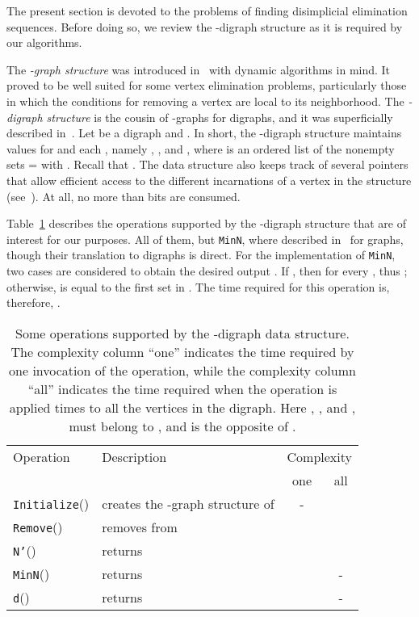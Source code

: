 \documentclass[a4paper,11pt]{article}
\begin{document}
The present section is devoted to the problems of finding disimplicial elimination sequences.  Before doing so, we review the -digraph structure as it is required by our algorithms.

The \emph{-graph structure} was introduced in~\cite{LinSoulignacSzwarcfiterTCS2012} with dynamic algorithms in mind.  It proved to be well suited for some vertex elimination problems, particularly those in which the conditions for removing a vertex are local to its neighborhood.  The \emph{-digraph structure} is the cousin of -graphs for digraphs, and it was superficially described in~\cite{LinSoulignacSzwarcfiterTCS2012}.  Let  be a digraph and .  In short, the -digraph structure maintains  values for  and each , namely , , and , where  is an ordered list of the nonempty sets  =  with .  Recall that .    The data structure also keeps track of several pointers that allow efficient access to the different incarnations of a vertex in the structure (see~\cite{LinSoulignacSzwarcfiterTCS2012}).  At all, no more than  bits are consumed.

Table~\ref{tab:h-operations} describes the operations supported by the -digraph structure that are of interest for our purposes.  All of them, but {\tt MinN}, where described in~\cite{LinSoulignacSzwarcfiterTCS2012} for graphs, though their translation to digraphs is direct.  For the implementation of {\tt MinN}, two cases are considered to obtain the desired output .  If , then  for every , thus ; otherwise,  is equal to the first set in .  The time required for this operation is, therefore, .  

\begin{table}
  \centering
  \begin{tabular}{llcc}
    \hline
    Operation & Description & \multicolumn{2}{c}{Complexity}\\
              &             & one & all \\\hline
    {\tt Initialize}() & creates the -graph structure of  & - & \\
    {\tt Remove}() & removes  from   &  &  \\
    {\tt N'}() & returns   &  &  \\
    {\tt MinN}() & returns  &  & -\\
    {\tt d}() & returns  &  & - \\
    \hline
  \end{tabular}
  \caption{Some operations supported by the -digraph data structure.  The complexity column ``one'' indicates the time required by one invocation of the operation, while the complexity column ``all'' indicates the time required when the operation is applied  times to all the vertices in the digraph.  Here , ,  and ,  must belong to , and  is the opposite of .}\label{tab:h-operations}
\end{table}
\end{document}
